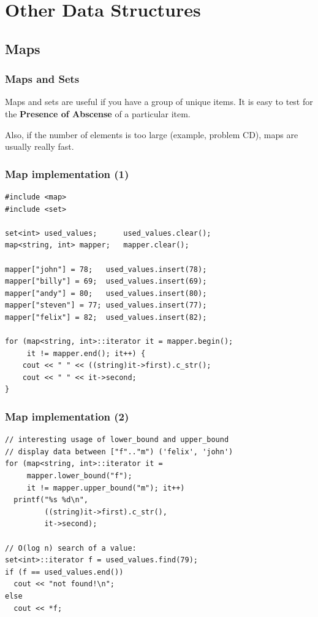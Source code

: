 \documentclass{beamer}
\begin{document}
\section{Other Data Structures}
\subsection{Maps}

\begin{frame}
  \frametitle{Maps and Sets}

  Maps and sets are useful if you have a group of unique items. It
  is easy to test for the {\bf Presence of Abscense} of a particular
  item.

  \vfill

  Also, if the number of elements is too large (example, problem CD),
  maps are usually really fast.
  
\end{frame}

\begin{frame}[fragile]
  \frametitle{Map implementation (1)}
  {\small
\begin{verbatim}
#include <map>
#include <set>

set<int> used_values;      used_values.clear();
map<string, int> mapper;   mapper.clear();

mapper["john"] = 78;   used_values.insert(78);
mapper["billy"] = 69;  used_values.insert(69);
mapper["andy"] = 80;   used_values.insert(80);
mapper["steven"] = 77; used_values.insert(77);
mapper["felix"] = 82;  used_values.insert(82);

for (map<string, int>::iterator it = mapper.begin(); 
     it != mapper.end(); it++) {
    cout << " " << ((string)it->first).c_str();
    cout << " " << it->second; 
} 
\end{verbatim}}
\end{frame}

\begin{frame}[fragile]
  \frametitle{Map implementation (2)}
  {\small
\begin{verbatim}
// interesting usage of lower_bound and upper_bound
// display data between ["f".."m") ('felix', 'john')
for (map<string, int>::iterator it = 
     mapper.lower_bound("f"); 
     it != mapper.upper_bound("m"); it++)
  printf("%s %d\n", 
         ((string)it->first).c_str(),
         it->second);

// O(log n) search of a value:
set<int>::iterator f = used_values.find(79);
if (f == used_values.end())
  cout << "not found!\n";
else
  cout << *f;
\end{verbatim}}
\end{frame}
\end{document}
